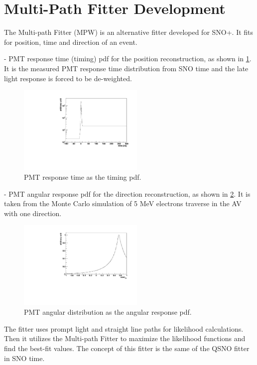 \documentclass[preprint,12pt]{elsarticle}
\begin{document}
\section{Multi-Path Fitter Development}

The Multi-path Fitter (MPW) is an alternative fitter developed for SNO+. It fits for position, time and direction of an event.

- PMT response time (timing) pdf for the position reconstruction, as shown in \ref{MPW_timingPDF}. It is the measured PMT response time distribution from SNO time and the late light response is forced to be de-weighted.

\begin{figure}[!htb]
	\centering
	\includegraphics[width=6cm]{MPW_timingPDF.pdf}
	\caption{PMT response time as the timing pdf.}
	\label{MPW_timingPDF}
\end{figure}

- PMT angular response pdf for the direction reconstruction, as shown in \ref{MPW_angularPDF}. It is taken from the Monte Carlo simulation of 5 MeV electrons traverse in the AV with one direction.

\begin{figure}[!htb]
	\centering
	\includegraphics[width=6cm]{MPW_angularPDF.pdf}
	\caption{PMT angular distribution as the angular response pdf.}
	\label{MPW_angularPDF}
\end{figure}

The fitter uses prompt light and straight line paths for likelihood calculations. Then it utilizes the Multi-path Fitter to maximize the likelihood functions and find the best-fit values. The concept of this fitter is the same of the QSNO fitter in SNO time.
\end{document}
